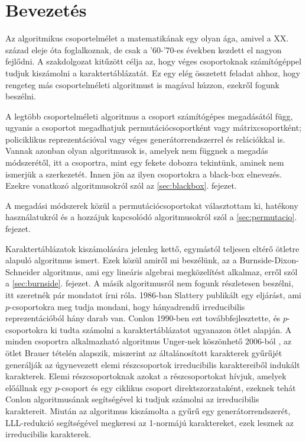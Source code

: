 \section*{Bevezetés}
\label{sec:bevezetes}
Az algoritmikus csoportelmélet a matematikának egy olyan ága, amivel a XX. század eleje óta foglalkoznak,
de csak a '60-'70-es években kezdett el nagyon fejlődni.
A szakdolgozat kitűzött célja az, hogy véges csoportoknak számítógéppel tudjuk kiszámolni a karaktertáblázatát.
Ez egy elég összetett feladat ahhoz, hogy rengeteg más csoportelméleti algoritmust is magával húzzon,
ezekről fogunk beszélni.

A legtöbb csoportelméleti algoritmus a csoport számítógépes megadásától függ, ugyanis
a csoportot megadhatjuk permutációcsoportként vagy mátrixcsoportként; policiklikus reprezentációval vagy
véges generátorrendszerrel és relációkkal is.
Vannak azonban olyan algoritmusok is, amelyek nem függnek a megadás módszerétől,
itt a csoportra, mint egy fekete dobozra tekintünk, aminek nem ismerjük a szerkezetét.
Innen jön az ilyen csoportokra a black-box elnevezés.
Ezekre vonatkozó algoritmusokról szól az \ref{sec:blackbox}. fejezet.

A megadási módszerek közül a permutációcsoportokat választottam ki, hatékony használatukról és a hozzájuk kapcsolódó algoritmusokról szól a \ref{sec:permutacio}. fejezet.

Karaktertáblázatok kiszámolására jelenleg kettő, egymástól teljesen eltérő ötletre alapuló algoritmus ismert.
Ezek közül amiről mi beszélünk, az a Burnside-Dixon-Schneider algoritmus, ami egy lineáris algebrai megközelítést alkalmaz,
erről szól a \ref{sec:burnside}. fejezet.
A másik algoritmusról nem fogunk részletesen beszélni, itt szeretnék pár mondatot írni róla.
1986-ban Slattery \cite{Sla86} publikált egy eljárást, ami $p$-csoportokra meg tudja mondani, hogy hányadrendű irreducibilis reprezentációból hány darab van.
Conlon 1990-ben \cite{Con90} ezt továbbfejlesztette, és $p$-csoportokra ki tudta számolni a karaktertáblázatot ugyanazon ötlet alapján.
A minden csoportra alkalmazható algoritmus Unger-nek köszönhető 2006-ból \cite{Ung06}, az ötlet Brauer tételén alapszik, miszerint az általánosított karakterek gyűrűjét generálják
az úgynevezett elemi részcsoportok irreducibilis karaktereiből indukált karakterek.
Elemi részcsoportoknak azokat a részcsoportokat hívjuk, amelyek előállnak egy $p$-csoport és egy ciklikus csoport direktszorzataként,
ezeknek tehát Conlon algoritmusának segítségével ki tudjuk számolni az irreducibilis karaktereit.
Miután az algoritmus kiszámolta a gyűrű egy generátorrendszerét, LLL-redukció \cite{LLL82} segítségével megkeresi az 1-normájú karaktereket, ezek lesznek az irreducibilis karakterek.

